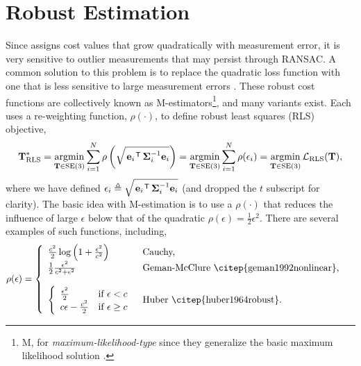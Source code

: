 \section{Robust Estimation}
Since  assigns cost values that grow quadratically with measurement error, it is very sensitive to outlier measurements that may persist through RANSAC.
A common solution to this problem is to replace the quadratic loss function with one that is less sensitive to large measurement errors \citep{MacTavish2015-wt}.
These robust cost functions are collectively known as M-estimators\footnote{M, for \textit{maximum-likelihood-type} since they generalize the basic maximum likelihood solution \citep{Barfoot2017-ri}.}, and many variants exist. Each uses a re-weighting function, $\rho(\cdot)$, to define robust least squares (RLS) objective,
\begin{equation}
	\label{eq:vo_robust_loss_problem}
  \boldsymbol{\mathbf{T}}^*_{\text{RLS}} = \operatorname*{argmin}_{\boldsymbol{\mathbf{T}}\in\text{SE}(3)}\sum_{i=1}^{N} 
  \rho\left(\sqrt{\left.{\boldsymbol{\mathbf{e}}_{i}}\right.^{\mkern-1.0mu\mathsf{T}} \boldsymbol{\mathbf{\Sigma}}_{i}^{-1} \boldsymbol{\mathbf{e}}_{i}}\right) = \operatorname*{argmin}_{\boldsymbol{\mathbf{T}}\in\text{SE}(3)}\sum_{i=1}^{N} 
  \rho(\epsilon_i) = \operatorname*{argmin}_{\boldsymbol{\mathbf{T}}\in\text{SE}(3)} \mathcal{L}_{\text{RLS}}(\boldsymbol{\mathbf{T}}),
\end{equation}
where we have defined $\epsilon_i \triangleq \sqrt{\left.{\boldsymbol{\mathbf{e}}_{i}}\right.^{\mkern-1.0mu\mathsf{T}} \boldsymbol{\mathbf{\Sigma}}_{i}^{-1} \boldsymbol{\mathbf{e}}_{i}}$ (and dropped the $t$ subscript for clarity). The basic idea with M-estimation is to use a $\rho(\cdot)$ that reduces the influence of large $\epsilon$ below that of the quadratic $\rho(\epsilon) = \frac{1}{2} \epsilon^2$. There are several examples of such functions, including,
\begin{align}
\rho(\epsilon) &= \left\{  	\begin{array}{ll}
		 \frac{c^2}{2} \log{\left(1 + \frac{\epsilon^2}{c^2}\right)}   & \mbox{Cauchy,} \\
		 \frac{1}{2} \frac{\epsilon^2}{c^2 + \epsilon^2}  & \mbox{Geman-McClure \citep{geman1992nonlinear},} \\
		 \\
		\left\{  	\begin{array}{ll}  \frac{\epsilon^2}{2} & \mbox{if} ~\epsilon < c \\
										c\epsilon - \frac{c^2}{2} & \mbox{if} ~ \epsilon \geq c \end{array}
																						 \right.   & \mbox{Huber \citep{huber1964robust}.} \\
	\end{array}
	\right.
\end{align}

